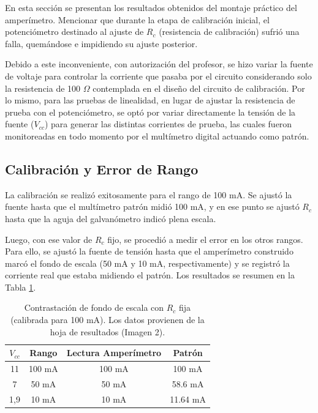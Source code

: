 

En esta sección se presentan los resultados obtenidos del montaje práctico del amperímetro. Mencionar que durante la etapa de calibración inicial, el potenciómetro destinado al ajuste de $R_c$ (resistencia de calibración) sufrió una falla, quemándose e impidiendo su ajuste posterior. 

Debido a este inconveniente, con autorización del profesor, se hizo variar la fuente de voltaje para controlar la corriente que pasaba por el circuito considerando solo la resistencia de 100 $\Omega$ contemplada en el diseño del circuito de calibración. Por lo mismo, para las pruebas de linealidad, en lugar de ajustar la resistencia de prueba con el potenciómetro, se optó por variar directamente la tensión de la fuente ($V_{cc}$) para generar las distintas corrientes de prueba, las cuales fueron monitoreadas en todo momento por el multímetro digital actuando como patrón.

\subsection{Calibración y Error de Rango}

La calibración se realizó exitosamente para el rango de 100 mA. Se ajustó la fuente hasta que el multímetro patrón midió 100 mA, y en ese punto se ajustó $R_c$ hasta que la aguja del galvanómetro indicó plena escala.

Luego, con ese valor de $R_c$ fijo, se procedió a medir el error en los otros rangos. Para ello, se ajustó la fuente de tensión hasta que el amperímetro construido marcó el fondo de escala (50 mA y 10 mA, respectivamente) y se registró la corriente real que estaba midiendo el patrón. Los resultados se resumen en la Tabla \ref{tab:calibracion}.

\begin{table}[h!]
    \centering
    \caption{Contrastación de fondo de escala con $R_c$ fija (calibrada para 100 mA). Los datos provienen de la hoja de resultados (Imagen 2).}
    \label{tab:calibracion}
    \begin{tabular}{cccc}
        \toprule
        \textbf{$V_{cc}$} & 
        \textbf{Rango} & \textbf{Lectura Amperímetro} & \textbf{Patrón} \\
        \midrule
        11 & 100 mA & 100 mA & 100 mA \\
        7 & 50 mA & 50 mA & 58.6 mA \\
        1,9 & 10 mA & 10 mA & 11.64 mA \\
        \bottomrule
    \end{tabular}
\end{table}

